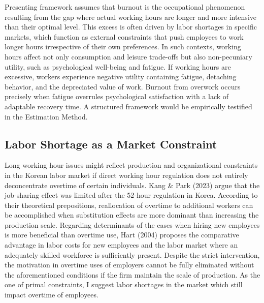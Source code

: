 \documentclass[
  12pt,
]{article}
\begin{document}
Presenting framework assumes that burnout is the occupational phenomenon
resulting from the gap where actual working hours are longer and more
intensive than their optimal level. This excess is often driven by labor
shortages in specific markets, which function as external constraints
that push employees to work longer hours irrespective of their own
preferences. In such contexts, working hours affect not only consumption
and leisure trade-offs but also non-pecuniary utility, such as
psychological well-being and fatigue. If working hours are excessive,
workers experience negative utility containing fatigue, detaching
behavior, and the depreciated value of work. Burnout from overwork
occurs precisely when fatigue overrules psychological satisfaction with
a lack of adaptable recovery time. A structured framework would be
empirically testified in the Estimation Method.

\subsection{Labor Shortage as a Market
Constraint}\label{labor-shortage-as-a-market-constraint}

Long working hour issues might reflect production and organizational
constraints in the Korean labor market if direct working hour regulation
does not entirely deconcentrate overtime of certain individuals. Kang \&
Park (2023) argue that the job-sharing effect was limited after the
52-hour regulation in Korea. According to their theoretical
prepositions, reallocation of overtime to additional workers can be
accomplished when substitution effects are more dominant than increasing
the production scale. Regarding determinants of the cases when hiring
new employees is more beneficial than overtime use, Hart (2004) proposes
the comparative advantage in labor costs for new employees and the labor
market where an adequately skilled workforce is sufficiently present.
Despite the strict intervention, the motivation in overtime uses of
employers cannot be fully eliminated without the aforementioned
conditions if the firm maintain the scale of production. As the one of
primal constraints, I suggest labor shortages in the market which still
impact overtime of employees.
\end{document}
